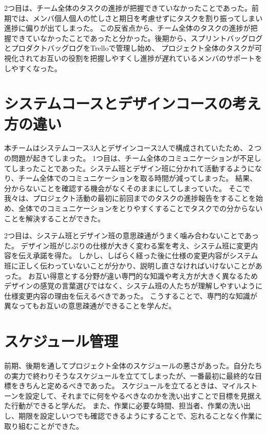 2つ目は、チーム全体のタスクの進捗が把握できていなかったことであった。前期では、メンバ個人個人の忙しさと期日を考慮せずにタスクを割り振ってしまい進捗に偏りが出てしまった。
この反省点から、チーム全体のタスクの進捗が把握できていなかったことであったと分かった。後期から、スプリントバッグログとプロダクトバッグログをTrelloで管理し始め、
プロジェクト全体のタスクが可視化されてお互いの役割を把握しやすくし進捗が遅れているメンバのサポートをしやすくなった。

\section{システムコースとデザインコースの考え方の違い}
本チームはシステムコース3人とデザインコース2人で構成されていたため、２つの問題が起きてしまった。
1つ目は、チーム全体のコミュニケーションが不足してしまったことであった。システム班とデザイン班に分かれて活動するようになり、チーム全体でのコミュニケーションを取る時間が減ってしまった。
結果、分からないことを確認する機会がなくそのままにしてしまっていた。
そこで我々は、プロジェクト活動の最初に前回までのタスクの進捗報告をすることを始め、全体でのコミュニケーションをとりやすくすることでタスクでの分からないことを解決することができた。

2つ目は、システム班とデザイン班の意思疎通がうまく噛み合わないことであった。
デザイン班がじぷりの仕様が大きく変わる案を考え、システム班に変更内容を伝え承諾を得た。
しかし、しばらく経った後に仕様の変更内容がシステム班に正しく伝わっていないことが分かり、説明し直さなければいけないことがあった。
お互い得意とする分野が違い専門的な知識や考え方が大きく異なるためデザインの感覚の言葉選びではなく、システム班の人たちが理解しやすいように仕様変更内容の理由を伝えるべきであった。
こうすることで、専門的な知識が異なってもお互いの意思疎通ができることを学んだ。

\section{スケジュール管理}
前期、後期を通してプロジェクト全体のスケジュールの悪さがあった。自分たちの実力で終わりそうなスケジュールを立ててしまったが、一番最初に最終的な目標をきちんと定めるべきであった。
スケジュールを立てるときは、マイルストーンを設定して、それまでに何をやるべきなのかを洗い出すことで目標を見据えた行動ができると学んだ。
また、作業に必要な時間、担当者、作業の洗い出し、期限を設定しいつでも確認できるようにすることで、忘れることなく作業に取り組むことができた。
